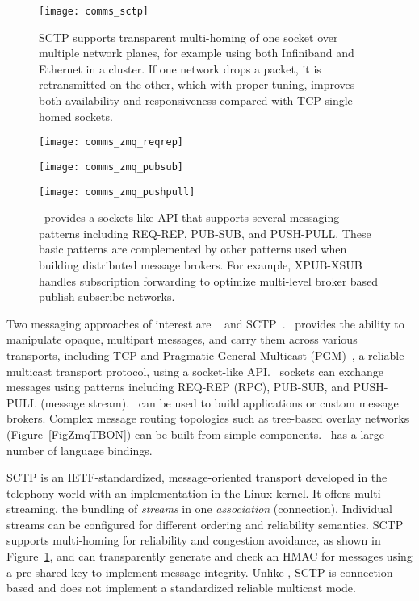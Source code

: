 \begin{figure}
\centering
\texttt{[image: comms\_sctp]}
\caption{SCTP supports transparent multi-homing of one socket over multiple
network planes, for example using both Infiniband and Ethernet in a cluster.
If one network drops a packet, it is retransmitted on the other, which with
proper tuning, improves both availability and responsiveness compared with
TCP single-homed sockets.}
\label{FigCommsSCTP}
\end{figure}

\begin{figure}
\begin{minipage}[b]{0.15\linewidth}
\texttt{[image: comms\_zmq\_reqrep]}
\end{minipage}
\hspace{0.5cm}
\begin{minipage}[b]{0.4\linewidth}
\texttt{[image: comms\_zmq\_pubsub]}
\end{minipage}
\hspace{0.5cm}
\begin{minipage}[b]{0.4\linewidth}
\texttt{[image: comms\_zmq\_pushpull]}
\end{minipage}
\caption{\zMQ\ provides a sockets-like API that supports several
messaging patterns including REQ-REP, PUB-SUB, and PUSH-PULL.
These basic patterns are complemented by other patterns used when
building distributed message brokers.  For example, XPUB-XSUB handles
subscription forwarding to optimize multi-level broker based
publish-subscribe networks.}
\label{FigCommsZmq}
\end{figure}

Two messaging approaches of interest are \zMQ~\cite{ZMQGuide} and
SCTP~\cite{SCTP}.
\zMQ\ provides the ability to manipulate opaque, multipart messages,
and carry them across various transports, including TCP and
Pragmatic General Multicast (PGM)~\cite{rfc3208}, a reliable multicast
transport protocol, using a socket-like API.
\zMQ\ sockets can exchange messages using patterns including
REQ-REP (RPC), PUB-SUB, and PUSH-PULL (message stream).
\zMQ\ can be used to build applications or custom message brokers.
Complex message routing topologies such as tree-based overlay networks
(Figure~\ref{FigZmqTBON}) can be built from simple components.
\zMQ\ has a large number of language bindings.

SCTP is an IETF-standardized, message-oriented transport developed
in the telephony world with an implementation in the Linux kernel.
It offers multi-streaming, the bundling of {\em streams} in one
{\em association} (connection).  Individual streams can be configured for
different ordering and reliability semantics.  SCTP supports
multi-homing for reliability and congestion avoidance, as shown in
Figure~\ref{FigCommsSCTP}, and
can transparently generate and check an HMAC for messages using a
pre-shared key to implement message integrity.  Unlike \zMQ, SCTP is
connection-based and does not implement a standardized reliable multicast
mode.

